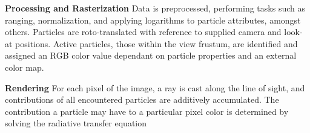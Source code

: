 \documentclass[runningheads,a4paper]{llncs}
\begin{document}
\vskip 1pc
\noindent
\textbf{Processing and Rasterization} 
   Data is preprocessed, performing tasks such as ranging, normalization, and applying logarithms to particle attributes, 
   amongst others. Particles are roto-translated with reference to supplied camera and look-at positions. Active particles, 
   those within the view frustum, are identified and assigned an RGB color value dependant on particle properties and an 
   external color map.  

\vskip 1pc
\noindent
\textbf{Rendering}
  For each pixel of the image, a ray is cast along the line of sight, and contributions of all encountered particles 
  are additively accumulated. The contribution a particle may have to a particular pixel color is determined by solving 
  the radiative transfer equation \cite{splotchgpu}





\end{document}
